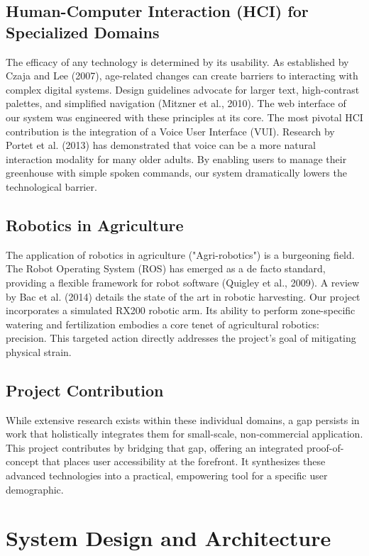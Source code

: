 \documentclass[12pt, a4paper]{report}
\begin{document}
\section{Human-Computer Interaction (HCI) for Specialized Domains}
The efficacy of any technology is determined by its usability. As established by Czaja and Lee (2007), age-related changes can create barriers to interacting with complex digital systems. Design guidelines advocate for larger text, high-contrast palettes, and simplified navigation (Mitzner et al., 2010). The web interface of our system was engineered with these principles at its core. The most pivotal HCI contribution is the integration of a Voice User Interface (VUI). Research by Portet et al. (2013) has demonstrated that voice can be a more natural interaction modality for many older adults. By enabling users to manage their greenhouse with simple spoken commands, our system dramatically lowers the technological barrier.

\section{Robotics in Agriculture}
The application of robotics in agriculture ("Agri-robotics") is a burgeoning field. The Robot Operating System (ROS) has emerged as a de facto standard, providing a flexible framework for robot software (Quigley et al., 2009). A review by Bac et al. (2014) details the state of the art in robotic harvesting. Our project incorporates a simulated RX200 robotic arm. Its ability to perform zone-specific watering and fertilization embodies a core tenet of agricultural robotics: precision. This targeted action directly addresses the project's goal of mitigating physical strain.

\section{Project Contribution}
While extensive research exists within these individual domains, a gap persists in work that holistically integrates them for small-scale, non-commercial application. This project contributes by bridging that gap, offering an integrated proof-of-concept that places user accessibility at the forefront. It synthesizes these advanced technologies into a practical, empowering tool for a specific user demographic.

\chapter{System Design and Architecture}
\end{document}
